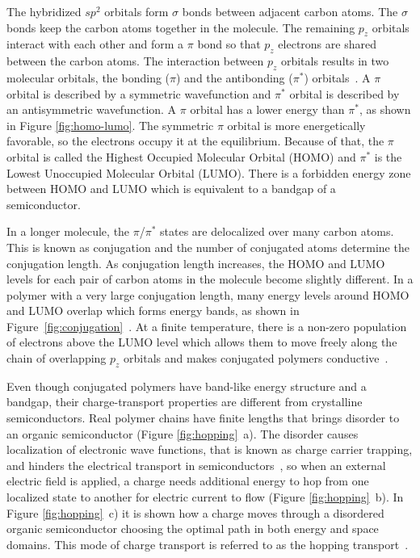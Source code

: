 The hybridized $sp^2$ orbitals form $\sigma$ bonds between adjacent carbon atoms. The $\sigma$ bonds keep the carbon atoms together in the molecule. The remaining $p_z$ orbitals interact with each other and form a $\pi$ bond so that $p_z$ electrons are shared between the carbon atoms. The interaction between $p_z$ orbitals results in two molecular orbitals, the bonding ($\pi$) and the antibonding ($\pi^*$) orbitals~\cite{Dermtroeder_3}. A $\pi$ orbital is described by a symmetric wavefunction and $\pi^*$ orbital is described by an antisymmetric wavefunction. A $\pi$ orbital has a lower energy than $\pi^*$, as shown in Figure \ref{fig:homo-lumo}. The symmetric $\pi$ orbital is more energetically favorable, so the electrons occupy it at the equilibrium. Because of that, the $\pi$ orbital is called the Highest Occupied Molecular Orbital (HOMO) and $\pi^*$ is the Lowest Unoccupied Molecular Orbital (LUMO). There is a forbidden energy zone between HOMO and LUMO which is equivalent to a bandgap of a semiconductor.\\ 
\par
In a longer molecule, the $\pi$/$\pi^*$ states are delocalized over many carbon atoms. This is known as conjugation and the number of conjugated atoms determine the conjugation length. As conjugation length increases, the HOMO and LUMO levels for each pair of carbon atoms in the molecule become slightly different. In a polymer with a very large conjugation length, many energy levels around HOMO and LUMO overlap which forms energy bands, as shown in Figure~\ref{fig:conjugation}~\cite{Koehler_book,cambridge}. At a finite temperature, there is a non-zero population of electrons above the LUMO level which allows them to move freely along the chain of overlapping $p_z$ orbitals and makes conjugated polymers conductive~\cite{heeger_polymers}.\\

\par Even though conjugated polymers have band-like energy structure and a bandgap, their charge-transport properties are different from crystalline semiconductors. Real polymer chains have finite lengths that brings disorder to an organic semiconductor (Figure \ref{fig:hopping}~a). The disorder causes localization of electronic wave functions, that is known as charge carrier trapping, and hinders the electrical transport in semiconductors~\cite{Yi2016,Meier2013}, so when an external electric field is applied, a charge needs additional energy to hop from one localized state to another for electric current to flow (Figure \ref{fig:hopping}~b). In Figure \ref{fig:hopping}~c) it is shown how a charge moves through a disordered organic semiconductor choosing the optimal path in both energy and space domains. This mode of charge transport is referred to as the hopping transport~\cite{Tessler2009}.\\


